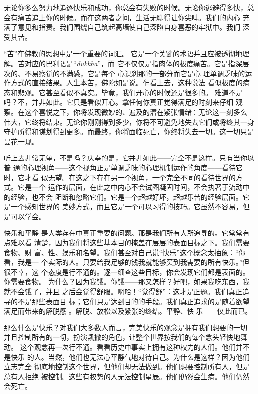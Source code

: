 无论你多么努力地追逐快乐和成功，你总会有失败的时候。无论你逃避得多快，总
会有痛苦追上你的时候。而在这两者之间，生活\1无聊得让你尖叫。我们的内心
充满了意见和指责。我们围绕自己筑起高墙使自己深陷自身喜恶的牢狱中。我们
深受其苦。

“苦”在佛教的思想中是一个重要的词汇。
它是一个关键的术语并且应被透彻地理解。苦对应的巴利语是“{\it dukkha}\/”，而
它不仅仅是指肉体的极度痛苦。它是指深层次的、不易察觉的不满感，它是每个
心识刹那的一部分而它是心
理单调乏味的运作方式的直接结果。人生本苦，佛陀如是说。乍看上去，这种说法
看似极度的病态和悲观。它甚至看似不真实。毕竟，我们开心的时候还是很多的。
难道不是吗？不，并非如此。它只是看似开心。拿任何你真正觉得满足的时刻来仔细
观察。在这个喜悦之下，你将发现微妙的、遍及的潜在紧张情绪：无论这一刻多么
伟大，它终将结束。无论你刚刚得到多少，你将不可避免地失去它们或将终其一身
守护所得和谋划得到更多。而最终，你将面临死亡，你终将失去一切。这一切只是
昙花一现。

听上去非常无望，不是吗？庆幸的是，它并非如此——完全不是这样。只有当你以普
通的心理视角——这个视角正是单调乏味的心理机制运作的角度——看待它时，它才看
似无望。在这之下存在另一个视角，一个完全不同的看待世界的方式。它是一个
运作的层面，在此之中内心不会试图凝固时间，不会执著于流动中的经验，也不会
阻断和忽略它们。它是一个超越好坏，超越乐苦的经验层面。它是一个感知世界的
美妙方式，而且它是一个可以习得的技巧。它虽然不容易，但是可以学会。

快乐和平静
是人类存在中真正重要的问题。那是我们所有人所追寻的。它常常有点难以\1看
清楚，因为我们将这些基本目的掩盖在层层的表面目标之下。我们需要食物、财
富、性、娱乐和名望。我们甚至对自己说“快乐”这个概念太抽象：“你看，我是一
个实际的人。只要给我足够的钱我就能够买到我需要的所有快乐。”但很不幸，这
个态度是行不通的。逐一细查这些目标，你会发现它们都是表面的。你需要食物。
为什么？因为我饿。你饿——那又怎样？好吧，如果我吃东西，我就不会饿了，并且
之后会觉得舒服。啊哈！“觉得舒”：这才是正题。我们真正追寻的不是那些表面目
标；它们只是达到目的的手段。我们真正追求的是随着欲望满足而带来的解脱感%
。解脱、放松以及紧张的终结。平静、快
乐——仅此而已。

那么什么是快乐？对我们大多数人而言，完美快乐的观念是拥有我们想要的一切
并且控制所有的一切，扮演凯撒的角色，让整个世界按我们的每个念头轻快地舞动。
这个观念再一次行不通。看看历史中事实上拥有这种权力的人们。他们并不是快乐
的人。当然，他们也无法心平静气地对待自己。为什么是这样？因为他们立志完全
彻底地控制这个世界，但他们却无法做到。他们想要控制所有人，但是总有人拒绝
被控制。这些有权势的人无法控制星辰。他们仍然会生病。他们仍然会死亡。

